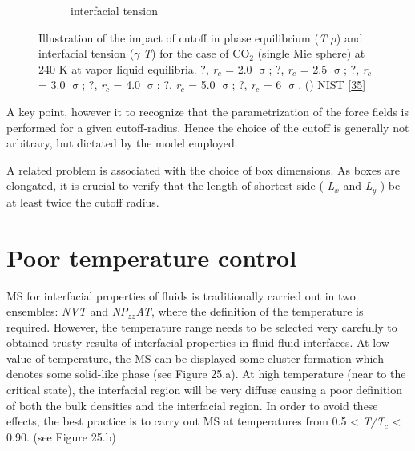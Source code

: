\documentclass{scrbook}
\begin{document}
\begin{figure}
\begin{subfigure}{0.4\textwidth}
    \caption{interfacial tension}
	\end{subfigure}
\caption{Illustration of the impact of cutoff in phase equilibrium (\textit{T}
\textendash{} {${\rho}$}) and interfacial tension ({${\gamma}$} \textendash{}
\textit{T}) for the case of CO$_{2}$ (single Mie sphere) at 240 K at vapor
\textendash{} liquid equilibria. ?, \textit{r}$_{c}$ = 2.0 {${\upsigma}$}; ?,
\textit{r}$_{c}$ = 2.5 {${\upsigma}$}; ?, \textit{r}$_{c}$ = 3.0
{${\upsigma}$}; ?, \textit{r}$_{c}$ = 4.0 {${\upsigma}$}; ?, \textit{r}$_{c}$
= 5.0 {${\upsigma}$}; ?, \textit{r}$_{c}$ = 6 {${\upsigma}$}. (\textemdash{})
NIST [{\hyperref[ref-011]{35}}]
}
\label{fig:24}
\end{figure}

A key point, however it to recognize that the parametrization of the force
fields is performed for a given cutoff-radius. Hence the choice of the cutoff
is generally not arbitrary, but dictated by the model employed. 

A related problem is associated with the choice of box dimensions. As boxes are
elongated, it is crucial to verify that the length of shortest side
( \textit{L}$_{x}$ and \textit{L}$_{y}$ ) be at least twice the cutoff radius.

\section{Poor temperature control}

MS for interfacial properties of fluids is traditionally carried out in two
ensembles: \textit{NVT} and \textit{NP}$_{zz}$\textit{AT}, where the definition
of the temperature is required. However, the temperature range needs to be
selected very carefully to obtained trusty results of interfacial properties in
fluid-fluid interfaces. At low value of temperature, the MS can be displayed
some cluster formation which denotes some solid-like phase (see Figure 25.a).
At high temperature (near to the critical state), the interfacial region will
be very diffuse causing a poor definition of both the bulk densities and the
interfacial region. In order to avoid these effects, the best practice is to
carry out MS at temperatures from 0.5 {\textless} \textit{T/T}$_{c}$
{\textless} 0.90. (see Figure 25.b) 
\end{document}
